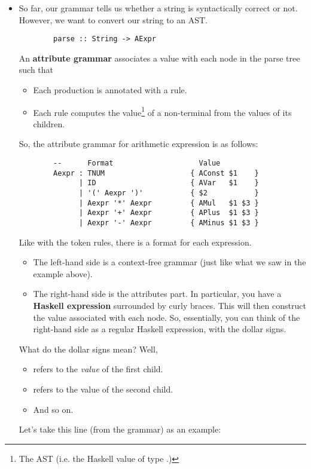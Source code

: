 \documentclass[letterpaper]{article}
\begin{document}
\begin{itemize}
    \item So far, our grammar tells us whether a string is syntactically correct or not. However, we want to convert our string to an AST. 
    \begin{verbatim}
        parse :: String -> AExpr \end{verbatim}
    An \textbf{attribute grammar} associates a value with each node in the parse tree such that 
    \begin{itemize}
        \item Each production is annotated with a rule.
        \item Each rule computes the value\footnote{The AST (i.e. the Haskell value of type .)} of a non-terminal from the values of its children.  
    \end{itemize}
    So, the attribute grammar for arithmetic expression is as follows: 
    \begin{verbatim}
        --      Format                    Value
        Aexpr : TNUM                    { AConst $1    }
              | ID                      { AVar   $1    }
              | '(' Aexpr ')'           { $2           }
              | Aexpr '*' Aexpr         { AMul   $1 $3 }
              | Aexpr '+' Aexpr         { APlus  $1 $3 } 
              | Aexpr '-' Aexpr         { AMinus $1 $3 }
    \end{verbatim}
    Like with the token rules, there is a format for each expression. 
    \begin{itemize}
        \item The left-hand side is a context-free grammar (just like what we saw in the example above). 
        \item The right-hand side is the attributes part. In particular, you have a \textbf{Haskell expression} surrounded by curly braces. This will then construct the value associated with each node. So, essentially, you can think of the right-hand side as a regular Haskell expression, with the dollar signs.
    \end{itemize}
    What do the dollar signs mean? Well,
    \begin{itemize}
        \item {} refers to the \emph{value} of the first child. 
        \item {} refers to the value of the second child. 
        \item And so on. 
    \end{itemize}
    Let's take this line (from the grammar) as an example: 

\end{itemize}
\end{document}
